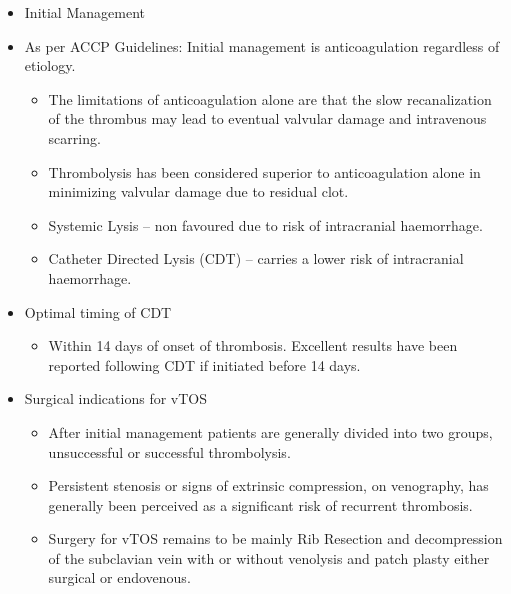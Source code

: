 \documentclass[
]{book}
\providecommand{\tightlist}{%
  \setlength{\itemsep}{0pt}\setlength{\parskip}{0pt}}
\begin{document}
\begin{itemize}
\item
  Initial Management
\item
  As per ACCP Guidelines: Initial management is anticoagulation
  regardless of etiology. \citet{kearonAntithromboticTherapyVTE2016}

  \begin{itemize}
  \item
    The limitations of anticoagulation alone are that the slow
    recanalization of the thrombus may lead to eventual valvular
    damage and intravenous scarring.
    \citet{sekharYearbookVascularEndovascular2018}
  \item
    Thrombolysis has been considered superior to anticoagulation
    alone in minimizing valvular damage due to residual clot.
    \citet{urschelSurgeryRemainsMost2008}
  \item
    Systemic Lysis -- non favoured due to risk of intracranial
    haemorrhage. \citet{grunwaldCatheterDirectedThrombolysisTreatment2004}
  \item
    Catheter Directed Lysis (CDT) -- carries a lower risk of
    intracranial haemorrhage.
  \end{itemize}
\item
  Optimal timing of CDT

  \begin{itemize}
  \tightlist
  \item
    Within 14 days of onset of thrombosis. Excellent results have
    been reported following CDT if initiated before 14 days.
    \citet{wilsonFibrinolyticTherapyIdiopathic1990}
  \end{itemize}
\item
  Surgical indications for vTOS

  \begin{itemize}
  \item
    After initial management patients are generally divided into two
    groups, unsuccessful or successful thrombolysis.
  \item
    Persistent stenosis or signs of extrinsic compression, on
    venography, has generally been perceived as a significant risk
    of recurrent thrombosis.
  \item
    Surgery for vTOS remains to be mainly Rib Resection and
    decompression of the subclavian vein with or without venolysis
    and patch plasty either surgical or endovenous.
  \end{itemize}
\end{itemize}
\end{document}
